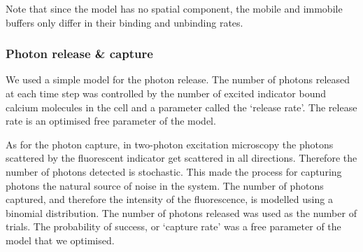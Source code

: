 \documentclass[a4paper,12pt]{article}
\theoremstyle{definition}
\begin{document}
Note that since the model has no spatial component, the mobile and immobile buffers only differ in their binding and unbinding rates.

\subsubsection{Photon release \& capture}
We used a simple model for the photon release. The number of photons released at each time step was controlled by the number of excited indicator bound calcium molecules in the cell and a parameter called the `release rate'. The release rate is an optimised free parameter of the model.

As for the photon capture, in two-photon excitation microscopy the photons scattered by the fluorescent indicator get scattered in all directions. Therefore the number of photons detected is stochastic. This made the process for capturing photons the natural source of noise in the system. The number of photons captured, and therefore the intensity of the fluorescence, is modelled using a binomial distribution. The number of photons released was used as the number of trials. The probability of success, or `capture rate' was a free parameter of the model that we optimised.
\end{document}

